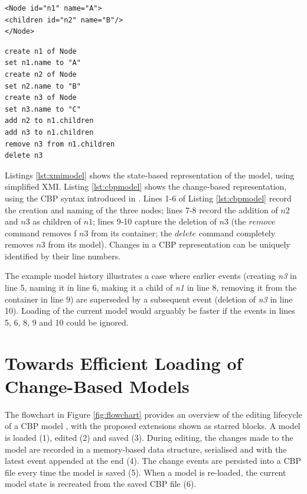 \documentclass{llncs}
\begin{document}
    \vspace{-10pt}
\begin{minipage}[t]{0.5\linewidth}
\begin{lstlisting}[style=xmi,caption={State-based tree model.},label=lst:xmimodel]
<Node id="n1" name="A">
<children id="n2" name="B"/>
</Node>
\end{lstlisting}
\end{minipage}
\hfill
\begin{minipage}[t]{0.5\linewidth}
\begin{lstlisting}[style=eol,caption={Change-based tree model.},label=lst:cbpmodel]
create n1 of Node
set n1.name to "A"  
create n2 of Node
set n2.name to "B"  
create n3 of Node
set n3.name to "C"  
add n2 to n1.children   
add n3 to n1.children
remove n3 from n1.children   
delete n3
\end{lstlisting}
\end{minipage}

    Listings \ref{lst:xmimodel} shows the state-based representation of the model, using simplified XMI.  Listing \ref{lst:cbpmodel} shows the change-based representation, using the CBP syntax introduced in \cite{yohannis2017turning}. Lines 1-6 of Listing \ref{lst:cbpmodel} record the creation and naming of the three nodes; lines 7-8 record the addition of $n2$ and $n3$ as children of $n1$; lines 9-10 capture the deletion of $n3$ (the $remove$ command removes f $n3$ from its container; the $delete$ command completely removes $n3$ from its model). Changes in a CBP representation can be uniquely identified by their line numbers.
    
    The example model history illustrates a case where  earlier events (creating \emph{n3} in line 5, naming it in line 6, making it a child of \emph{n1} in line 8, removing it from the container in line 9) are superseded by a subsequent event (deletion of \emph{n3} in line 10).  Loading of the current model would arguably be faster if the events in lines 5, 6, 8, 9 and 10 could be ignored.
    
    \vspace{-10pt}
    \section{Towards Efficient Loading of Change-Based Models}
    \label{sec:loading_time_optimisation}
    
    \vspace{-10pt}
    The flowchart in Figure \ref{fig:flowchart} provides an overview of the editing lifecycle of a CBP model \cite{yohannis2017turning}, with the proposed extensions shown as starred blocks. A model is loaded (1), edited (2) and saved (3).  During editing, the changes made to the model are recorded in a memory-based data structure, serialised and with the latest event appended at the end (4). The change events are persisted into a CBP file every time the model is saved (5). When a model is re-loaded, the current model state is recreated from the saved CBP file (6).
    
\end{document}

